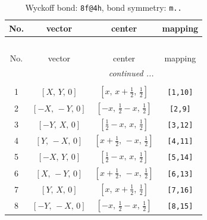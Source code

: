 \documentclass[fleqn,8pt]{jsarticle}
\begin{document}
\begin{longtable}{cccc}
\caption{Wyckoff bond: {\tt 8f@4h}, bond symmetry: {\tt m..}}
 \\
 \hline \hline
No. & vector & center & mapping \\ \hline \endfirsthead

\multicolumn{3}{l}{\tablename\ \thetable{}} \\
 \hline \hline
No. & vector & center & mapping \\ \hline \endhead

 \hline \hline
\multicolumn{3}{r}{\footnotesize\it continued ...} \\ \endfoot

 \hline \hline
\multicolumn{3}{r}{} \\ \endlastfoot

1 & $\left[ X,\, Y,\, 0 \right]$ & $\left[ x,\, x + \frac{1}{2},\, \frac{1}{2} \right]$ & {\tt [1,10]} \\ \hline
2 & $\left[ - X,\, - Y,\, 0 \right]$ & $\left[ - x,\, \frac{1}{2} - x,\, \frac{1}{2} \right]$ & {\tt [2,9]} \\ \hline
3 & $\left[ - Y,\, X,\, 0 \right]$ & $\left[ \frac{1}{2} - x,\, x,\, \frac{1}{2} \right]$ & {\tt [3,12]} \\ \hline
4 & $\left[ Y,\, - X,\, 0 \right]$ & $\left[ x + \frac{1}{2},\, - x,\, \frac{1}{2} \right]$ & {\tt [4,11]} \\ \hline
5 & $\left[ - X,\, Y,\, 0 \right]$ & $\left[ \frac{1}{2} - x,\, x,\, \frac{1}{2} \right]$ & {\tt [5,14]} \\ \hline
6 & $\left[ X,\, - Y,\, 0 \right]$ & $\left[ x + \frac{1}{2},\, - x,\, \frac{1}{2} \right]$ & {\tt [6,13]} \\ \hline
7 & $\left[ Y,\, X,\, 0 \right]$ & $\left[ x,\, x + \frac{1}{2},\, \frac{1}{2} \right]$ & {\tt [7,16]} \\ \hline
8 & $\left[ - Y,\, - X,\, 0 \right]$ & $\left[ - x,\, \frac{1}{2} - x,\, \frac{1}{2} \right]$ & {\tt [8,15]} \\
\end{longtable}
\renewcommand{\arraystretch}{1.2}
\end{document}
